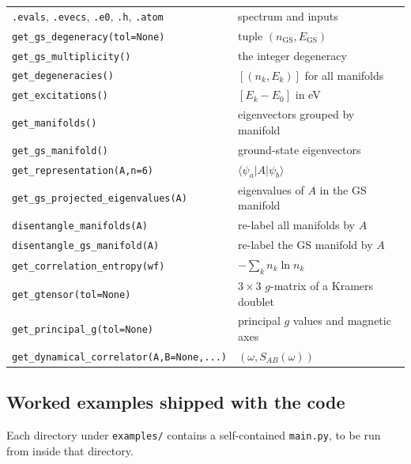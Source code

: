 \documentclass[11pt,a4paper]{article}
\newcommand{\op}[1]{\texttt{#1}}
\begin{document}
\begin{center}
\begin{tabular}{ll}
\toprule
\op{.evals}, \op{.evecs}, \op{.e0}, \op{.h}, \op{.atom} & spectrum and inputs\\
\op{get\_gs\_degeneracy(tol=None)}   & tuple $(n_{\mathrm{GS}},E_{\mathrm{GS}})$\\
\op{get\_gs\_multiplicity()}         & the integer degeneracy\\
\op{get\_degeneracies()}             & $[(n_k,E_k)]$ for all manifolds\\
\op{get\_excitations()}              & $[E_k-E_0]$ in eV\\
\op{get\_manifolds()}                & eigenvectors grouped by manifold\\
\op{get\_gs\_manifold()}             & ground-state eigenvectors\\
\op{get\_representation(A,n=6)}      & $\langle\psi_a|A|\psi_b\rangle$\\
\op{get\_gs\_projected\_eigenvalues(A)} & eigenvalues of $A$ in the GS manifold\\
\op{disentangle\_manifolds(A)}       & re-label all manifolds by $A$\\
\op{disentangle\_gs\_manifold(A)}    & re-label the GS manifold by $A$\\
\op{get\_correlation\_entropy(wf)}   & $-\sum_k n_k\ln n_k$\\
\op{get\_gtensor(tol=None)}          & $3\times3$ $g$-matrix of a Kramers doublet\\
\op{get\_principal\_g(tol=None)}     & principal $g$ values and magnetic axes\\
\op{get\_dynamical\_correlator(A,B=None,...)} & $(\omega, S_{AB}(\omega))$\\
\bottomrule
\end{tabular}
\end{center}

\subsection{Worked examples shipped with the code}

Each directory under \op{examples/} contains a self-contained \op{main.py},
to be run from inside that directory.
\end{document}
